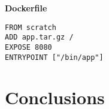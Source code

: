\documentclass[aspectratio=169]{beamer}
\begin{document}
\begin{frame}
  \vspace{1.0cm}
  \Huge
  \bfseries
  \centering Dockerfile
  \huge
  \vspace{1.0cm}
  \mdseries
\begin{verbatim}
FROM scratch
ADD app.tar.gz /
EXPOSE 8080
ENTRYPOINT ["/bin/app"]
\end{verbatim}
\end{frame}

\section{Conclusions}

{
%
\begin{frame}[plain,t]
  \vfill
  \centering
  \Huge
  \bfseries
  \lsstyle
\end{frame}
}
\end{document}
